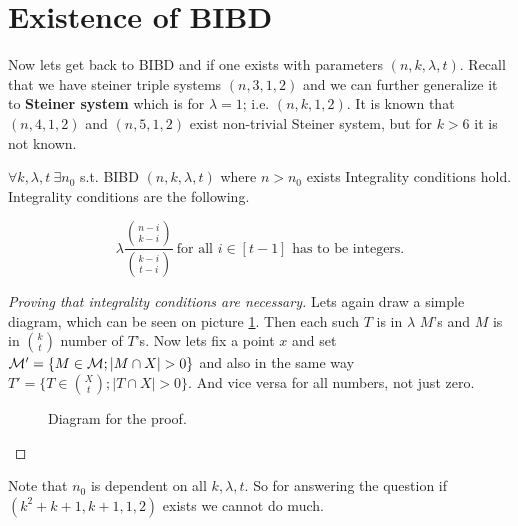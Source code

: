 \section{Existence of BIBD}

Now lets get back to BIBD and if one exists with parameters $(n,k,\lambda,t)$. Recall that we have steiner triple systems $(n,3,1,2)$ and we can further generalize it to \textbf{Steiner system} which is for $\lambda = 1$; i.e. $(n,k,1,2)$. It is known that $(n,4,1,2)$ and $(n,5,1,2)$ exist non-trivial Steiner system, but for $k > 6$ it is not known.

\begin{thm}[P. Keevash]
	$\forall k, \lambda, t \ \exists n_0$ s.t. BIBD $(n,k,\lambda, t)$ where $n > n_0$ exists \ifft Integrality conditions hold. Integrality conditions are the following.
	
	$$
	\lambda \frac{\binom{n - i}{k-i}}{\binom{k-i}{t-i}} \ \text{for all } i \in [t-1] \text{ has to be integers.}
	$$
\end{thm}

\begin{proof}[Proving that integrality conditions are necessary]
	Lets again draw a simple diagram, which can be seen on picture \ref{nec-integr-cond}. Then each such $T$ is in $\lambda$ $M$'s and $M$ is in $\binom{k}{t}$ number of $T$'s. Now lets fix a point $x$ and set $\mathcal{M}' = \{M \in \mathcal{M}; |M \cap X| > 0\}$ and also in the same way $T' = \{T \in \binom{X}{t}; |T \cap X| > 0\}$. And vice versa for all numbers, not just zero.
	
	\begin{figure}[!ht]\centering
		\caption{Diagram for the proof.}
		\label{nec-integr-cond}
	\end{figure}
\end{proof}

Note that $n_0$ is dependent on all $k,\lambda,t$. So for answering the question if $(k^2 + k +1, k+1, 1, 2)$ exists we cannot do much.

